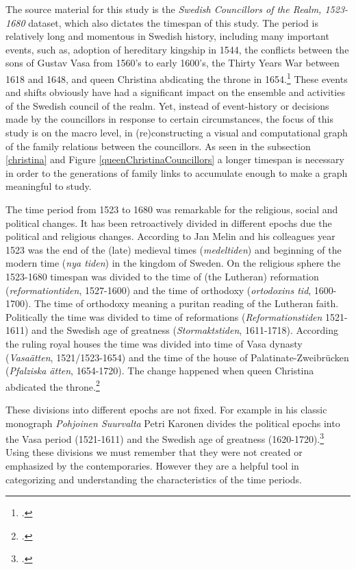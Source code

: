 The source material for this study is the \textit{Swedish Councillors of the Realm, 1523-1680} dataset, which also dictates the timespan of this study. The period is relatively long and momentous in Swedish history, including many important events, such as, adoption of hereditary kingship in 1544, the conflicts between the sons of Gustav Vasa from 1560's to early 1600's, the Thirty Years War between 1618 and 1648, and queen Christina abdicating the throne in 1654.\footcite[pp. 8-9.]{personalAgency} These events and shifts obviously have had a significant impact on the ensemble and activities of the Swedish council of the realm. Yet, instead of event-history or 
decisions made by the councillors in response to certain circumstances, the focus of this study is on the macro level, in (re)constructing a visual and computational graph of the family relations between the councillors. As seen in the subsection \ref{christina} and Figure \ref{queenChristinaCouncillors} a longer timespan is necessary in order to the generations of family links to accumulate enough to make a graph meaningful to study.

The time period from 1523 to 1680 was remarkable for the religious, social and political changes. It has been retroactively divided in different epochs due the political and religious changes. According to Jan Melin and his colleagues year 1523 was the end of the (late) medieval times (\textit{medeltiden}) and beginning of the modern time (\textit{nya tiden}) in the kingdom of Sweden. On the religious sphere the 1523-1680 timespan was divided to the time of (the Lutheran) reformation (\textit{reformationtiden}, 1527-1600) and the time of orthodoxy (\textit{ortodoxins tid}, 1600-1700). The time of orthodoxy meaning a puritan reading of the Lutheran faith. Politically the time was divided to time of reformations (\textit{Reformationstiden} 1521-1611) and the Swedish age of greatness (\textit{Stormaktstiden}, 1611-1718). According the ruling royal houses the time was divided into time of Vasa dynasty (\textit{Vasaätten}, 1521/1523-1654) and the time of the house of Palatinate-Zweibrücken (\textit{Pfalziska ätten}, 1654-1720). The change happened when queen Christina abdicated the throne.\footcite[pp. 458-459.]{MelinEtAl}

These divisions into different epochs are not fixed. For example in his classic monograph \textit{Pohjoinen Suurvalta} Petri Karonen divides the political epochs into the Vasa period (1521-1611) and the Swedish age of greatness (1620-1720).\footcite[pp. 7-9.]{pSuurvalta} Using these divisions we must remember that they were not created or emphasized by the contemporaries. However they are a helpful tool in categorizing and understanding the characteristics of the time periods.

